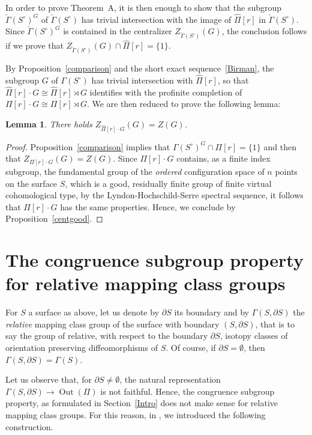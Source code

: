 \documentclass[12pt,twoside]{amsart}
\newtheorem{lemma}[theorem]{Lemma}
\theoremstyle{definition}
\def\Out{\operatorname{Out}}
\def\hP{{\widehat\Pi}}
\def\dd{\partial}
\def\G{{\Gamma}}
\def\kG{{\check\Gamma}}
\begin{document}
In order to prove Theorem~A, it is then enough to show that the subgroup $\kG(S^\circ)^G$ of $\kG(S^\circ)$ has trivial intersection with
the image of $\hP[r]$ in $\kG(S^\circ)$. Since $\kG(S^\circ)^G$ is contained in the centralizer $Z_{\kG(S^\circ)}(G)$, 
the conclusion follows if we prove that $Z_{\kG(S^\circ)}(G)\cap\hP[r]=\{1\}$.

By Proposition~\ref{comparison} and the short exact sequence~\eqref{Birman}, the subgroup $G$ of $\G(S^\circ)$ has trivial intersection  
with $\hP[r]$, so that $\hP[r]\cdot G\cong\hP[r]\rtimes G$ identifies with the profinite completion of $\Pi[r]\cdot G\cong\Pi[r]\rtimes G$.
We are then reduced to prove the following lemma:

\begin{lemma}\label{Gcentconf}There holds $Z_{\hP[r]\cdot G}(G)=Z(G)$.
\end{lemma}

\begin{proof}Proposition~\ref{comparison} implies that $\G(S^\circ)^G\cap\Pi[r]=\{1\}$ and then that $Z_{\Pi[r]\cdot G}(G)=Z(G)$.
Since $\Pi[r]\cdot G$ contains, as a finite index subgroup, the fundamental group of the \emph{ordered} configuration space of 
$n$ points on the surface $S$, which is a good, residually finite group of finite virtual cohomological type, by the Lyndon-Hochschild-Serre 
spectral sequence, it follows that $\Pi[r]\cdot G$ has the same properties. Hence, we conclude by Proposition~\ref{centgood}.
\end{proof}




\section{The congruence subgroup property for relative mapping class groups}
For $S$ a surface as above, let us denote by $\dd S$ its boundary and by $\G(S,\dd S)$ the \emph{relative} mapping class group of the 
surface with boundary $(S,\dd S)$, that is to say the group of relative, with respect to the boundary $\dd S$, isotopy classes of orientation 
preserving diffeomorphisms of $S$. Of course, if $\dd S=\emptyset$, then $\G(S,\dd S)=\G(S)$.

Let us observe that, for $\dd S\neq\emptyset$, the natural representation $\G(S,\dd S)\to\Out(\Pi)$ is not faithful. 
Hence, the congruence subgroup property, as formulated in Section~\ref{Intro} does not make sense for relative mapping class groups. 
For this reason, in \cite[Section~2.7]{Aut}, we introduced the following construction.
\end{document}
